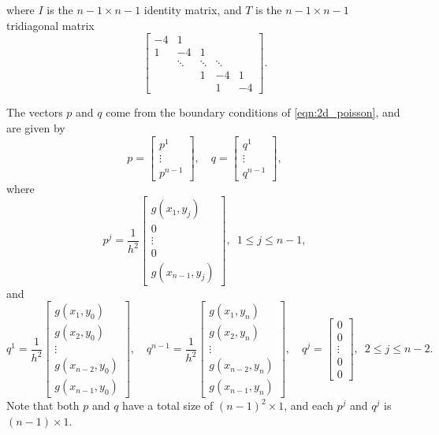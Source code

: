 \noindent where $I$ is the $n-1\times n-1$ identity matrix, and $T$ is the $n-1\times n-1$ tridiagonal matrix
\[\begin{bmatrix}
-4 & 1 & &  &\\
1 &-4 & 1 & &\\
&\ddots  & \ddots & \ddots & \\
&  & 1 & -4 & 1 \\
&  &  & 1 & -4 \end{bmatrix}.\]

The vectors $p$ and $q$ come from the boundary conditions of \eqref{eqn:2d_poisson}, and are given by
\[p = \begin{bmatrix} p^1 \\ \vdots \\ p^{n-1} \end{bmatrix}, \quad  q = \begin{bmatrix} q^1 \\ \vdots \\ q^{n-1} \end{bmatrix},\]
where
\[p^j = \frac{1}{h^2} \begin{bmatrix} g(x_1,y_j)\\ 0 \\ \vdots \\0\\ g(x_{n-1},y_j) \end{bmatrix} ,\,\,\, 1 \leq j \leq n-1,\]
and
\[q^1 = \frac{1}{h^2}\begin{bmatrix} g(x_1,y_0)  \\ g(x_2,y_0) \\ \vdots \\ g(x_{n-2},y_0) \\ g(x_{n-1},y_0) \end{bmatrix}, \quad q^{n-1} = \frac{1}{h^2}\begin{bmatrix} g(x_1,y_n) \\ g(x_2,y_n)\\ \vdots \\ g(x_{n-2},y_n)\\ g(x_{n-1},y_n) \end{bmatrix}, \quad q^{j} = \begin{bmatrix} 0 \\ 0 \\ \vdots \\ 0 \\ 0 \end{bmatrix} ,\,\,\, 2 \leq j \leq n-2.\]
Note that both $p$ and $q$ have a total size of $(n-1)^2 \times 1$, and each $p^j$ and $q^j$ is $(n-1)\times1$.

